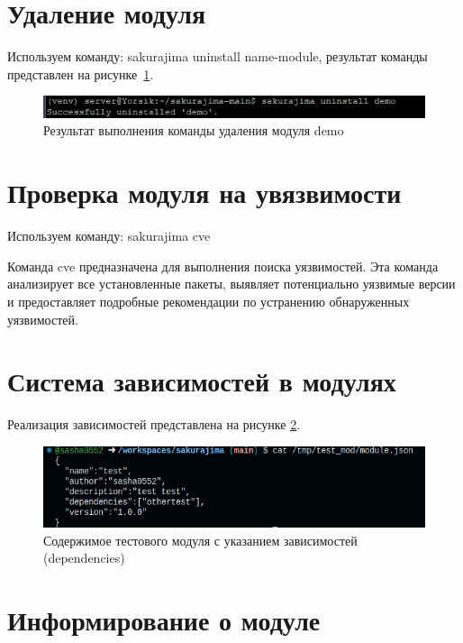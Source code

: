 \newpage

\section{Удаление модуля}

Используем команду: sakurajima uninstall name-module, результат команды представлен на рисунке~\ref{fig:test8}. 

\begin{figure}
  \centering
  \includegraphics[width=.8\textwidth]{graphics/test/dev_uninstall.png}
  \caption{Результат выполнения команды удаления модуля demo}
  \label{fig:test8}
\end{figure}

\section{Проверка модуля на увязвимости}

Используем команду: sakurajima cve

Команда cve предназначена для выполнения поиска уязвимостей. Эта команда анализирует все установленные пакеты, выявляет потенциально уязвимые версии и предоставляет подробные рекомендации по устранению обнаруженных уязвимостей.

\section{Система зависимостей в модулях}

Реализация зависимостей представлена на рисунке \ref{fig:test9}.

\begin{figure}
  \centering
  \includegraphics[width=.8\textwidth]{graphics/test/info2.png}
  \caption{Содержимое тестового модуля с указанием зависимостей (dependencies)}
  \label{fig:test9}
\end{figure}

\section{Информирование о модуле}

